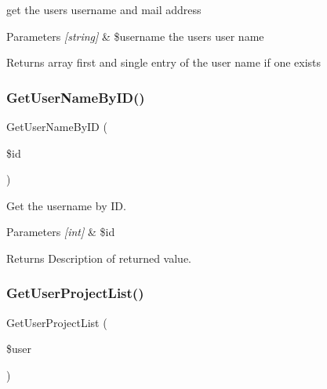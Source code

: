 get the user\textquotesingle{}s username and mail address 


\begin{DoxyParams}{Parameters}
{\em \mbox{[}string\mbox{]}} & \$username the user\textquotesingle{}s user name\\
\hline
\end{DoxyParams}
\begin{DoxyReturn}{Returns}
array first and single entry of the user name if one exists 
\end{DoxyReturn}
\mbox{\label{class_user_d_a_o_a5f2cf101cdf7bb9e47c12733ca95ae72}} 
\subsubsection{\texorpdfstring{Get\+User\+Name\+By\+I\+D()}{GetUserNameByID()}}
{\footnotesize\ttfamily Get\+User\+Name\+By\+ID (\begin{DoxyParamCaption}\item[{}]{\$id }\end{DoxyParamCaption})}



Get the username by ID. 


\begin{DoxyParams}{Parameters}
{\em \mbox{[}int\mbox{]}} & \$id \\
\hline
\end{DoxyParams}
\begin{DoxyReturn}{Returns}
Description of returned value. 
\end{DoxyReturn}
\mbox{\label{class_user_d_a_o_ac0d96a9079082c5781d10904523c57b9}} 
\subsubsection{\texorpdfstring{Get\+User\+Project\+List()}{GetUserProjectList()}}
{\footnotesize\ttfamily Get\+User\+Project\+List (\begin{DoxyParamCaption}\item[{}]{\$user }\end{DoxyParamCaption})}



